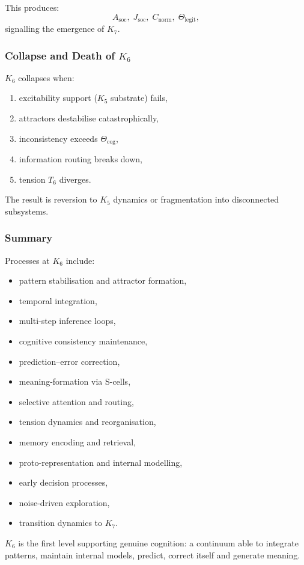 This produces:
\[
A_{\text{soc}},\; J_{\text{soc}},\;
C_{\text{norm}},\;
\Theta_{\text{legit}},
\]
signalling the emergence of $K_7$.

\subsubsection{Collapse and Death of \texorpdfstring{$K_6$}{K_6}}

$K_6$ collapses when:
\begin{enumerate}
    \item excitability support ($K_5$ substrate) fails,
    \item attractors destabilise catastrophically,
    \item inconsistency exceeds $\Theta_{\text{cog}}$,
    \item information routing breaks down,
    \item tension $T_6$ diverges.
\end{enumerate}

The result is reversion to $K_5$ dynamics or fragmentation into
disconnected subsystems.

\subsubsection{Summary}

Processes at $K_6$ include:
\begin{itemize}
    \item pattern stabilisation and attractor formation,
    \item temporal integration,
    \item multi-step inference loops,
    \item cognitive consistency maintenance,
    \item prediction–error correction,
    \item meaning-formation via S-cells,
    \item selective attention and routing,
    \item tension dynamics and reorganisation,
    \item memory encoding and retrieval,
    \item proto-representation and internal modelling,
    \item early decision processes,
    \item noise-driven exploration,
    \item transition dynamics to $K_7$.
\end{itemize}

$K_6$ is the first level supporting genuine cognition:
a continuum able to integrate patterns, maintain internal models,
predict, correct itself and generate meaning.
